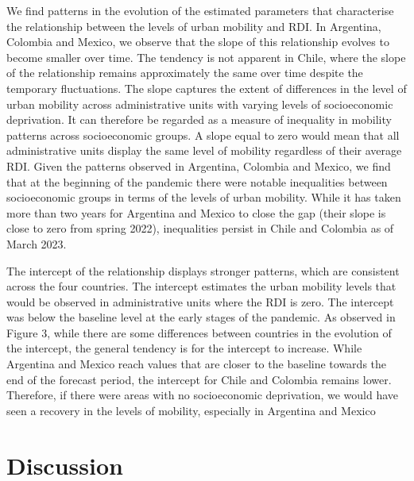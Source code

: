 \documentclass[
  11pt,
]{article}
\begin{document}
We find patterns in the evolution of the estimated parameters that
characterise the relationship between the levels of urban mobility and
RDI. In Argentina, Colombia and Mexico, we observe that the slope of
this relationship evolves to become smaller over time. The tendency is
not apparent in Chile, where the slope of the relationship remains
approximately the same over time despite the temporary fluctuations. The
slope captures the extent of differences in the level of urban mobility
across administrative units with varying levels of socioeconomic
deprivation. It can therefore be regarded as a measure of inequality in
mobility patterns across socioeconomic groups. A slope equal to zero
would mean that all administrative units display the same level of
mobility regardless of their average RDI. Given the patterns observed in
Argentina, Colombia and Mexico, we find that at the beginning of the
pandemic there were notable inequalities between socioeconomic groups in
terms of the levels of urban mobility. While it has taken more than two
years for Argentina and Mexico to close the gap (their slope is close to
zero from spring 2022), inequalities persist in Chile and Colombia as of
March 2023.

The intercept of the relationship displays stronger patterns, which are
consistent across the four countries. The intercept estimates the urban
mobility levels that would be observed in administrative units where the
RDI is zero. The intercept was below the baseline level at the early
stages of the pandemic. As observed in Figure 3, while there are some
differences between countries in the evolution of the intercept, the
general tendency is for the intercept to increase. While Argentina and
Mexico reach values that are closer to the baseline towards the end of
the forecast period, the intercept for Chile and Colombia remains lower.
Therefore, if there were areas with no socioeconomic deprivation, we
would have seen a recovery in the levels of mobility, especially in
Argentina and Mexico

\section{Discussion}\label{sec-discussion}
\end{document}
